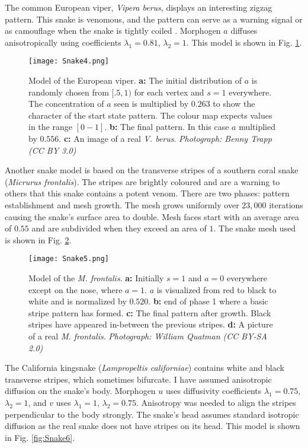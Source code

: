 \newpage
The common European viper, \textit{Vipera berus}, displays an interesting zigzag pattern. This snake is venomous, and the pattern can serve as a warning signal or as camouflage when the snake is tightly coiled \citep{lillywhite2014}. Morphogen $a$ diffuses anisotropically using coefficients $\lambda_{1}=0.81$, $\lambda_{2}=1$. This model is shown in Fig. \ref{fig:Snake4}.

\begin{figure}[ht]
	\centering
	\texttt{[image: Snake4.png]}
	\caption{Model of the European viper. \textbf{a:} The initial distribution of $a$ is randomly chosen from $[.5, 1)$ for each vertex and $s=1$ everywhere. The concentration of $a$ seen is multiplied by $0.263$ to show the character of the start state pattern. The colour map expects values in the range $[0-1]$. \textbf{b:} The final pattern. In this case $a$ multiplied by $0.556$. \textbf{c:} An image of a real \textit{V. berus}. \textit{Photograph: Benny Trapp (CC BY 3.0)}}
	\label{fig:Snake4}
\end{figure}

\newpage
Another snake model is based on the transverse stripes of a southern coral snake (\textit{Micrurus frontalis}). The stripes are brightly coloured and are a warning to others that this snake contains a potent venom. There are two phases: pattern establishment and mesh growth. The mesh grows uniformly over $23,000$ iterations causing the snake's surface area to double. Mesh faces start with an average area of $0.55$ and are subdivided when they exceed an area of $1$. The snake mesh used is shown in Fig. \ref{fig:Snake5}.

\begin{figure}[ht]
	\centering
	\texttt{[image: Snake5.png]}
	\caption{Model of the \textit{M. frontalis}. \textbf{a:} Initially $s=1$ and $a=0$ everywhere except on the nose, where $a=1$. $a$ is visualized from red to black to white and is normalized by $0.520$. \textbf{b:} end of phase 1 where a basic stripe pattern has formed. \textbf{c:} The final pattern after growth. Black stripes have appeared in-between the previous stripes. \textbf{d:} A picture of a real \textit{M. frontalis}. \textit{Photograph: William Quatman (CC BY-SA 2.0)}}
	\label{fig:Snake5}
\end{figure}

\newpage 

The California kingsnake (\textit{Lampropeltis californiae}) contains white and black transverse stripes, which sometimes bifurcate. I have assumed anisotropic diffusion on the snake's body. Morphogen $u$ uses diffusivity coefficients $\lambda_{1}=0.75$, $\lambda_{2}=1$, and $v$ uses $\lambda_{1}=1$, $\lambda_{2}=0.75$. Anisotropy was needed to align the stripes perpendicular to the body strongly. The snake's head assumes standard isotropic diffusion as the real snake does not have stripes on its head. This model is shown in Fig. \ref{fig:Snake6}.

